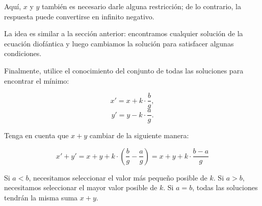 Aquí, $x$ y $y$ también es necesario darle alguna restricción; de lo contrario, la respuesta puede convertirse en infinito negativo.

La idea es similar a la sección anterior: encontramos cualquier solución de la ecuación diofántica y luego cambiamos la solución para satisfacer algunas condiciones.

Finalmente, utilice el conocimiento del conjunto de todas las soluciones para encontrar el mínimo:

$$x' = x + k \cdot \frac{b}{g},$$
$$y' = y - k \cdot \frac{a}{g}.$$

Tenga en cuenta que $x + y$ cambiar de la siguiente manera:

$$x' + y' = x + y + k \cdot \left(\frac{b}{g} - \frac{a}{g}\right) = x + y + k \cdot \frac{b-a}{g}$$

Si $a<b$, necesitamos seleccionar el valor más pequeño posible de $k$. Si $a>b$, necesitamos seleccionar el mayor valor posible de $k$. Si $a=b$, todas las soluciones tendrán la misma suma $x+y$.